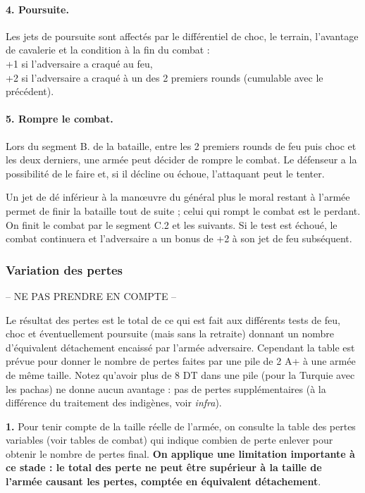 \paragraph{4. Poursuite.}
Les jets de poursuite sont affectés par le différentiel de choc,
le terrain, l'avantage de cavalerie et la condition à la fin du combat : \\
+1 si l'adversaire a craqué au feu, \\
+2 si l'adversaire a craqué à un des 2 premiers rounds (cumulable avec le précédent).

\paragraph{5. Rompre le combat.}\label{RetraiteEnBataille}
Lors du segment B. de la bataille, entre les 2 premiers rounds de feu puis choc et les
deux derniers, une armée peut décider de rompre le combat.
Le défenseur a la possibilité de le faire et, si il décline ou échoue, l'attaquant
peut le tenter.

Un jet de dé inférieur à la man{\oe}uvre du général plus le moral restant à l'armée
permet de finir la bataille tout de suite ;
celui qui rompt le combat est le perdant. On finit le combat par le segment  C.2
et les suivants. Si le test est échoué, le combat continuera et l'adversaire a un
bonus de +2 à son jet de feu subséquent.


\subsubsection{Variation des pertes}
-- NE PAS PRENDRE EN COMPTE --

\label{PertesVariables}
Le résultat des pertes est le total de ce qui est fait aux différents tests de feu,
choc et éventuellement poursuite (mais sans la retraite) donnant un nombre d'équivalent
détachement encaissé par
l'armée adversaire. Cependant la table est prévue pour donner le nombre de
pertes faites par une pile de 2 A+ à une armée de même taille. Notez
qu'avoir plus de 8 DT dans une pile (pour la Turquie avec les pachas) ne
donne aucun avantage : pas de pertes supplémentaires (à la différence
du traitement des indigènes, voir \textit{infra}).

{\bf 1.} Pour tenir compte de la taille réelle de l'armée, on consulte la table des
pertes variables (voir tables de combat) qui indique combien de perte enlever pour obtenir le nombre
de pertes final. \textbf{On applique une limitation importante à ce stade :
le total des
perte ne peut être supérieur à la taille de l'armée causant les pertes, comptée
en équivalent détachement}.

